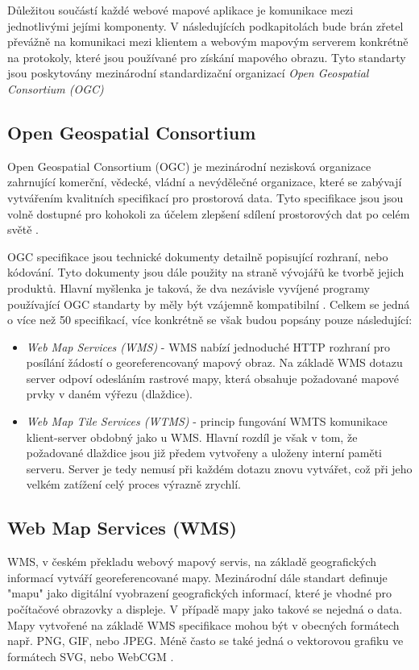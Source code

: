 Důležitou součástí každé webové mapové aplikace je komunikace mezi jednotlivými jejími komponenty. V následujících podkapitolách bude brán zřetel převážně na komunikaci mezi klientem a webovým mapovým serverem konkrétně na protokoly, které jsou používané pro získání mapového obrazu. Tyto standarty jsou poskytovány mezinárodní standardizační organizací \textit{Open Geospatial Consortium (OGC)}

\subsection{Open Geospatial Consortium}
Open Geospatial Consortium (OGC) je mezinárodní nezisková organizace zahrnující komerční, vědecké, vládní a nevýdělečné organizace, které se zabývají vytvářením kvalitních specifikací pro prostorová data. Tyto specifikace jsou jsou volně dostupné pro kohokoli za účelem zlepšení sdílení prostorových dat po celém světě \cite{oqc_web}.

OGC specifikace jsou technické dokumenty detailně popisující rozhraní, nebo kódování. Tyto dokumenty jsou dále použity na straně vývojářů ke tvorbě jejich produktů. Hlavní myšlenka je taková, že dva nezávisle vyvíjené programy používající OGC standarty by měly být vzájemně kompatibilní \cite{oqc_web}. Celkem se jedná o více než 50 specifikací, více konkrétně se však budou popsány pouze následující:

\newpage
\begin{itemize}
	\item\textit{Web Map Services (WMS)} - WMS nabízí jednoduché HTTP rozhraní pro posílání žádostí o georeferencovaný mapový obraz. Na základě WMS dotazu server odpoví odesláním rastrové mapy, která obsahuje požadované mapové prvky v daném výřezu (dlaždice).
	 
	\item\textit{Web Map Tile Services (WTMS)} - princip fungování WMTS komunikace klient-server obdobný jako u WMS. Hlavní rozdíl je však v tom, že požadované dlaždice jsou již předem vytvořeny a uloženy interní paměti serveru. Server je tedy nemusí při každém dotazu znovu vytvářet, což při jeho velkém zatížení celý proces výrazně zrychlí. 
\end{itemize}

\subsection{Web Map Services (WMS)}
WMS, v českém překladu webový mapový servis, na základě geografických informací vytváří georeferencované mapy. Mezinárodní dále standart definuje "mapu" jako digitální vyobrazení geografických informací, které je vhodné pro počítačové obrazovky a displeje. V případě mapy jako takové se nejedná o data. Mapy vytvořené na základě WMS specifikace mohou být v obecných formátech např. PNG, GIF, nebo JPEG. Méně často se také jedná o vektorovou grafiku ve formátech SVG, nebo WebCGM \cite{oqc_wms}.     

